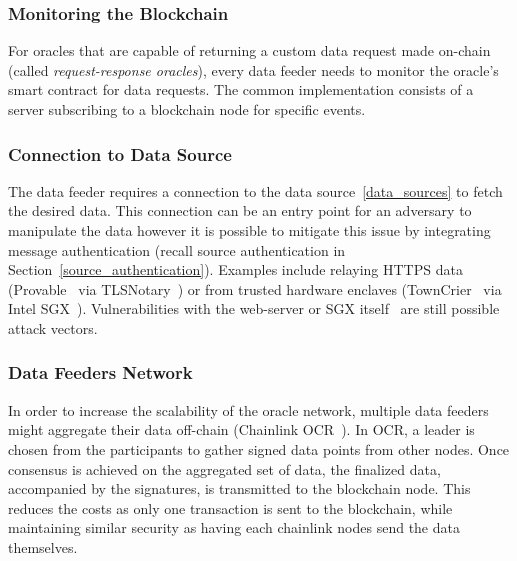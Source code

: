 \subsubsection{Monitoring the Blockchain}

For oracles that are capable of returning a custom data request made on-chain (called \textit{request-response oracles}), every data feeder needs to monitor the oracle's smart contract for data requests. The common implementation consists of a server subscribing to a blockchain node for specific events. 


\subsubsection{Connection to Data Source}

The data feeder requires a connection to the data source~\ref{data_sources} to fetch the desired data. This connection can be an entry point for an adversary to manipulate the data however it is possible to mitigate this issue by integrating message authentication  (recall source authentication in Section~\ref{source_authentication}). Examples include relaying HTTPS data (\eg Provable~\cite{bernanioraclize} via TLS\-Notary~\cite{tlsnotary}) or from trusted hardware enclaves (\eg TownCrier~\cite{zhang2016town} via Intel SGX~\cite{costan2016intel}). Vulnerabilities with the web-server or SGX itself~\cite{brasser2017software} are still possible attack vectors.


\subsubsection{Data Feeders Network}

In order to increase the scalability of the oracle network, multiple data feeders might aggregate their data off-chain (\eg Chainlink OCR~\cite{chainlinkocr}). In OCR, a leader is chosen from the participants to gather signed data points from other nodes. Once consensus is achieved on the aggregated set of data, the finalized data, accompanied by the signatures, is  transmitted to the blockchain node. This reduces the costs as only one transaction is sent to the blockchain, while maintaining similar security as having each chainlink nodes send the data themselves. 

